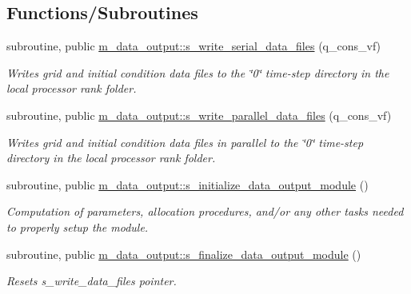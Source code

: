 \subsection*{Functions/\+Subroutines}
\begin{DoxyCompactItemize}
\item 
subroutine, public \hyperlink{namespacem__data__output_abaf86e34cd05a2227a23bcef0671a391}{m\+\_\+data\+\_\+output\+::s\+\_\+write\+\_\+serial\+\_\+data\+\_\+files} (q\+\_\+cons\+\_\+vf)
\begin{DoxyCompactList}\small\item\em Writes grid and initial condition data files to the \char`\"{}0\char`\"{} time-\/step directory in the local processor rank folder. \end{DoxyCompactList}\item 
subroutine, public \hyperlink{namespacem__data__output_a12a171700eb3f8a63d17c01a0033cf39}{m\+\_\+data\+\_\+output\+::s\+\_\+write\+\_\+parallel\+\_\+data\+\_\+files} (q\+\_\+cons\+\_\+vf)
\begin{DoxyCompactList}\small\item\em Writes grid and initial condition data files in parallel to the \char`\"{}0\char`\"{} time-\/step directory in the local processor rank folder. \end{DoxyCompactList}\item 
subroutine, public \hyperlink{namespacem__data__output_ab65b312ef83adb104cafafada9c998b6}{m\+\_\+data\+\_\+output\+::s\+\_\+initialize\+\_\+data\+\_\+output\+\_\+module} ()
\begin{DoxyCompactList}\small\item\em Computation of parameters, allocation procedures, and/or any other tasks needed to properly setup the module. \end{DoxyCompactList}\item 
subroutine, public \hyperlink{namespacem__data__output_a02f2b04a434c1f0ebf9156147d0f976e}{m\+\_\+data\+\_\+output\+::s\+\_\+finalize\+\_\+data\+\_\+output\+\_\+module} ()
\begin{DoxyCompactList}\small\item\em Resets s\+\_\+write\+\_\+data\+\_\+files pointer. \end{DoxyCompactList}\end{DoxyCompactItemize}
